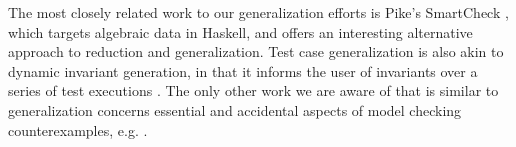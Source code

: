 The most closely related work to our generalization efforts is Pike's
SmartCheck \cite{SmartCheck}, which targets algebraic data in
Haskell, and offers an interesting alternative approach to reduction
and generalization.  Test case generalization is also akin to dynamic invariant generation,
in that it informs the user of invariants over a series of test
executions \cite{Daikon}.  The only other work we are aware of that is
similar to generalization concerns essential and accidental aspects of
model checking counterexamples, e.g. \cite{FreeWill,MakeMost,SPIN03}.  